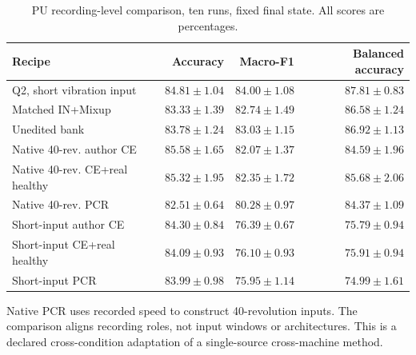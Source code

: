 \begin{table}[pos=htbp]
\centering\footnotesize
\caption{PU recording-level comparison, ten runs, fixed final state. All scores are percentages.}
\label{tab:pcr-last}
\begin{tabular}{lrrr}
\toprule
Recipe & Accuracy & Macro-F1 & Balanced accuracy\\
\midrule
Q2, short vibration input & $84.81\pm1.04$ & $84.00\pm1.08$ & $87.81\pm0.83$\\
Matched IN+Mixup & $83.33\pm1.39$ & $82.74\pm1.49$ & $86.58\pm1.24$\\
Unedited bank & $83.78\pm1.24$ & $83.03\pm1.15$ & $86.92\pm1.13$\\
Native 40-rev. author CE & $85.58\pm1.65$ & $82.07\pm1.37$ & $84.59\pm1.96$\\
Native 40-rev. CE+real healthy & $85.32\pm1.95$ & $82.35\pm1.72$ & $85.68\pm2.06$\\
Native 40-rev. PCR & $82.51\pm0.64$ & $80.28\pm0.97$ & $84.37\pm1.09$\\
Short-input author CE & $84.30\pm0.84$ & $76.39\pm0.67$ & $75.79\pm0.94$\\
Short-input CE+real healthy & $84.09\pm0.93$ & $76.10\pm0.93$ & $75.91\pm0.94$\\
Short-input PCR & $83.99\pm0.98$ & $75.95\pm1.14$ & $74.99\pm1.61$\\
\bottomrule
\end{tabular}
\par\medskip\begin{minipage}{.98\linewidth}\footnotesize Native PCR uses recorded speed to construct 40-revolution inputs. The comparison aligns recording roles, not input windows or architectures. This is a declared cross-condition adaptation of a single-source cross-machine method.\end{minipage}
\end{table}
